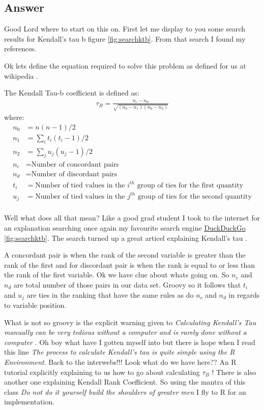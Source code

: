 \documentclass[letterpaper,10pt]{article}
\begin{document}
\subsection*{Answer}
Good Lord where to start on this on. First let me display to you some search results for Kendall's tau b figure \ref{fig:searchktb}. From that search I found my references.\newline

Ok lets define the equation required to solve this problem as defined for us at wikipedia \cite{wiki:kendall}.

The Kendall Tau-b coefficient is defined as:
\begin{align*}
\tau_B = \frac{n_c - n_d}{\sqrt{(n_0 - n_1)(n_0 - n_2)}}
\end{align*}
where:
\begin{align*}
n_0 & = n(n-1)/2 \\
n_1 & = \sum_i t_i (t_i - 1)/2 \\
n_2 & = \sum_j u_j (u_j - 1)/2 \\
n_c & = \textrm{Number of concordant pairs} \\
n_d & = \textrm{Number of discordant pairs} \\
t_i & = \textrm{Number of tied values in the $i^{th}$ group of ties for the first quantity} \\
u_j & = \textrm{Number of tied values in the $j^{th}$ group of ties for the second quantity} \\
\end{align*}

Well what does all that mean?  Like a good grad student I took to the internet for an explanation searching once again my favourite search engine \href{www.duckduckgo.com}{DuckDuckGo} \ref{fig:searchktb}.
The search turned up a great articel explaining Kendall's tau \cite{ktau}.

A concordant pair is when the rank of the second variable is greater than the rank of the first and for discordant pair is when the rank is equal to or less than the rank of the first variable\cite{ktau}.
Ok we have clue about whats going on. So \(n_c\) and \(n_d\) are total number of those pairs in our data set.
Groovy so it follows that  \(t_i\) and \(u_j\) are ties in the ranking that have the same rules as do \(n_c\) and \(n_d\) in regards to variable position.

What is not so groovy is the explicit warning given to 
\emph{ Calculating Kendall's Tau manually can be very tedious without a computer and is rarely done without a computer }. Oh boy what have I gotten myself into but there is hope when I read this line \emph{The process to calculate Kendall's tau is quite simple using the R Environment}\cite{ktau}. 
\newline \newline 
Back to the interwebs!!! Look what do we have here?? An R tutorial explicitly explaining to us how to go about calculating $\tau_B$ \cite{taubr}! There is also another one explaining Kendall Rank Coefficient\cite{taurc}.
\newline \newline 
So using the mantra of this class \emph{Do not do it yourself build  the shoulders of greater men} I fly to R for an implementation.
\end{document}
